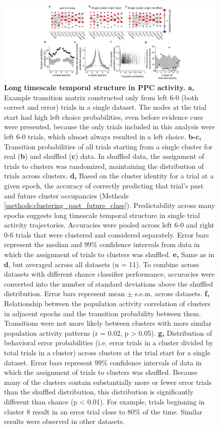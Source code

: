 \begin{figure}
\includegraphics[width=1.5\textwidth,center]{figures/fig_3_9.pdf}
\caption[Long timescale temporal structure in PPC activity.]
{\textbf{Long timescale temporal structure in PPC activity. a,} Example transition matrix constructed only from left 6-0 (both correct and error) trials in a single dataset. The nodes at the trial start had high left choice probabilities, even before evidence cues were presented, because the only trials included in this analysis were left 6-0 trials, which almost always resulted in a left choice.
%
\textbf{b-c,} Transition probabilities of all trials starting from a single cluster for real (\textbf{b}) and shuffled (\textbf{c}) data. In shuffled data, the assignment of trials to clusters was randomized, maintaining the distribution of trials across clusters.
%
\textbf{d,} Based on the cluster identity for a trial at a given epoch, the accuracy of correctly predicting that trial's past and future cluster occupancies (Methods \ref{methods:clustering_past_future_class}). Predictability across many epochs suggests long timescale temporal structure in single trial activity trajectories. Accuracies were pooled across left 6-0 and right 0-6 trials that were clustered and considered separately. Error bars represent the median and 99\% confidence intervals from data in which the assignment of trials to clusters was shuffled. 
%
\textbf{e,} Same as in \textbf{d}, but averaged across all datasets (n = 11). To combine across datasets with different chance classifier performance, accuracies were converted into the number of standard deviations above the shuffled distribution. Error bars represent mean $\pm$ s.e.m. across datasets. 
%
\textbf{f,} Relationship between the population activity correlation of clusters in adjacent epochs and the transition probability between them. Transitions were not more likely between clusters with more similar population activity patterns (r = 0.02, p > 0.05).
%
\textbf{g,} Distribution of behavioral error probabilities (i.e. error trials in a cluster divided by total trials in a cluster) across clusters at the trial start for a single dataset. Error bars represent 99\% confidence intervals of data in which the assignment of trials to clusters was shuffled. Because many of the clusters contain substantially more or fewer error trials than the shuffled distribution, this distribution is significantly different than chance (p < 0.01). For example, trials beginning in cluster 8 result in an error trial close to 80\% of the time. Similar results were observed in other datasets.
\label{fig:3_9}}
\end{figure} 


